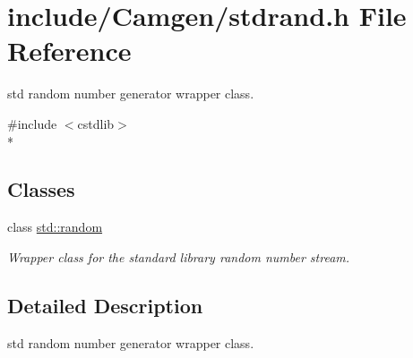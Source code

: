 \hypertarget{a00765}{\section{include/\-Camgen/stdrand.h File Reference}
\label{a00765}
}


std random number generator wrapper class.  


{\ttfamily \#include $<$cstdlib$>$}\\*
\subsection*{Classes}
\begin{DoxyCompactItemize}
\item 
class \hyperlink{a00459}{std\-::random}
\begin{DoxyCompactList}\small\item\em Wrapper class for the standard library random number stream. \end{DoxyCompactList}\end{DoxyCompactItemize}


\subsection{Detailed Description}
std random number generator wrapper class. 